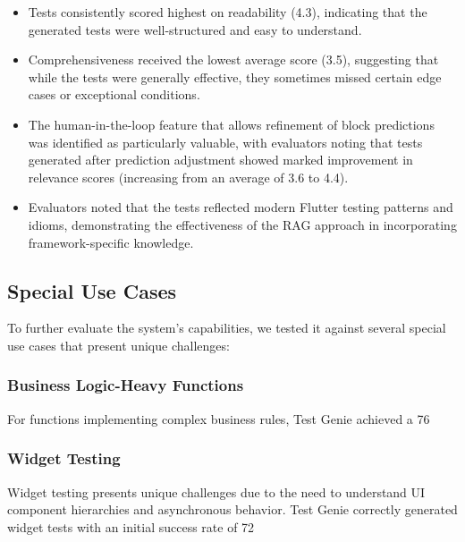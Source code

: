 \begin{itemize}
    \item Tests consistently scored highest on readability (4.3), indicating that the generated tests were well-structured and easy to understand.
    
    \item Comprehensiveness received the lowest average score (3.5), suggesting that while the tests were generally effective, they sometimes missed certain edge cases or exceptional conditions.
    
    \item The human-in-the-loop feature that allows refinement of block predictions was identified as particularly valuable, with evaluators noting that tests generated after prediction adjustment showed marked improvement in relevance scores (increasing from an average of 3.6 to 4.4).
    
    \item Evaluators noted that the tests reflected modern Flutter testing patterns and idioms, demonstrating the effectiveness of the RAG approach in incorporating framework-specific knowledge.
\end{itemize}

\subsection{Special Use Cases}

To further evaluate the system's capabilities, we tested it against several special use cases that present unique challenges:

\subsubsection{Business Logic-Heavy Functions}

For functions implementing complex business rules, Test Genie achieved a 76%

\subsubsection{Widget Testing}

Widget testing presents unique challenges due to the need to understand UI component hierarchies and asynchronous behavior. Test Genie correctly generated widget tests with an initial success rate of 72%

